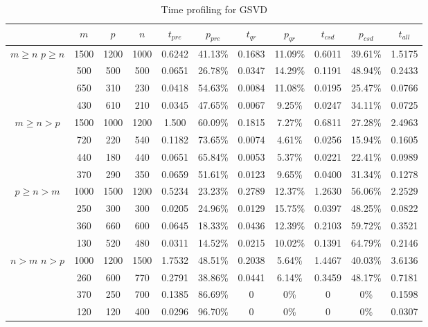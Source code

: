     \begin{center}
        \begin{table}[H]
        \begin{tabular}{||c | c | c | c || c | c | c | c | c | c | c ||} 
         \hline
          & $m$ & $p$ & $n$ & $t_{pre}$ & $p_{pre}$ & $t_{qr}$ & $p_{qr}$ & $t_{csd}$ & $p_{csd}$ & $t_{all}$ \\ [0.5ex] 
         \hline\hline
          & 1500 & 1200 & 1000 & 0.6242 & 41.13\% & 0.1683 & 11.09\% & 0.6011 & 39.61\% & 1.5175\\
         & 500 & 500 & 500 & 0.0651 & 26.78\% &  0.0347 & 14.29\% & 0.1191 & 48.94\% & 0.2433 \\
         & 650 & 310 & 230 & 0.0418 & 54.63\% & 0.0084 & 11.08\% & 0.0195 & 25.47\% & 0.0766 \\
         & 430 & 610 & 210 & 0.0345 & 47.65\% & 0.0067 & 9.25\% & 0.0247 & 34.11\% & 0.0725 \\
        \hline\hline
          & 1500 & 1000 & 1200 & 1.500 & 60.09\% & 0.1815 & 7.27\% & 0.6811 & 27.28\% & 2.4963 \\ 
         & 720 & 220 & 540 & 0.1182 & 73.65\% & 0.0074 & 4.61\% & 0.0256 & 15.94\% & 0.1605 \\
         & 440 & 180 & 440 & 0.0651 & 65.84\% & 0.0053 & 5.37\% & 0.0221 & 22.41\% & 0.0989 \\
         & 370 & 290 & 350 & 0.0659 & 51.61\% & 0.0123 & 9.65\% & 0.0400 & 31.34\% & 0.1278 \\
         \hline\hline 
          & 1000 & 1500 & 1200 & 0.5234 & 23.23\% & 0.2789 & 12.37\% & 1.2630 & 56.06\% & 2.2529 \\
         & 250 & 300 & 300 & 0.0205 & 24.96\% & 0.0129 & 15.75\% & 0.0397 & 48.25\% & 0.0822 \\
         & 360 & 660 & 600 & 0.0645 & 18.33\% & 0.0436 & 12.39\% & 0.2103 & 59.72\% & 0.3521 \\
         & 130 & 520 & 480 & 0.0311 & 14.52\% & 0.0215 & 10.02\% & 0.1391 & 64.79\% & 0.2146 \\
         \hline \hline
          & 1000 & 1200 & 1500 & 1.7532 & 48.51\% & 0.2038 & 5.64\% & 1.4467 &  40.03\% & 3.6136\\
         & 260 & 600 & 770 & 0.2791 & 38.86\% & 0.0441 & 6.14\% & 0.3459 & 48.17\% & 0.7181 \\
         & 370 & 250 & 700 & 0.1385 & 86.69\% & 0 & 0\% & 0 & 0\% & 0.1598\\
         & 120 & 120 & 400 & 0.0296 & 96.70\% & 0 & 0\% & 0 & 0\% & 0.0307\\
         \hline
        \end{tabular}
        \caption{Time profiling for GSVD}
        \label{table:2}
        \end{table}
        \end{center}
        
